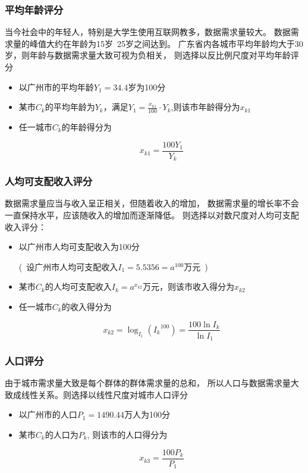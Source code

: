 \documentclass[UTF8,12pt]{ctexart}
\begin{document}
        \subsubsection{平均年龄评分}
            当今社会中的年轻人，特别是大学生使用互联网教多，数据需求量较大。
            数据需求量的峰值大约在年龄为15岁~25岁之间达到。
            广东省内各城市平均年龄均大于30岁，则年龄与数据需求量大致可视为负相关，
            则选择以反比例尺度对平均年龄评分
            \begin{itemize}
                \item 以广州市的平均年龄$Y_1=34.4$岁为100分
                \item 某市$C_k$的平均年龄为$Y_k$，满足$Y_1=\displaystyle\frac{x_{k1}}{100}·Y_k$,则该市年龄得分为$x_{k1}$
                \item 任一城市$C_k$的年龄得分为\begin{large}
                    $$x_{k1}=\frac{100Y_1}{Y_k}$$
                \end{large}
            \end{itemize}

        \subsubsection{人均可支配收入评分}
            数据需求量应当与收入呈正相关，但随着收入的增加，
            数据需求量的增长率不会一直保持水平，应该随收入的增加而逐渐降低。
            则选择以对数尺度对人均可支配收入评分：
            \begin{itemize}
                \item 以广州市人均可支配收入为100分\par 
                    (\ 设广州市人均可支配收入$I_1=5.5356=a^{100}$万元\ )
                \item 某市$C_k$的人均可支配收入$I_k=a^{x_{k2}}$万元，则该市收入得分为$x_{k2}$
                \item 任一城市$C_k$的收入得分为\begin{large}
                    $$x_{k2}=\log _{I_1}({I_k}^{100})=\frac{100\ln I_k}{\ln I_1}$$
                \end{large}
            \end{itemize}

        \subsubsection{人口评分}
            由于城市需求量大致是每个群体的群体需求量的总和，
            所以人口与数据需求量大致成线性关系。则选择以线性尺度对城市人口评分
            \begin{itemize}
                \item 以广州市的人口$P_1=1490.44$万人为100分
                \item 某市$C_k$的人口为$P_k$,
                    则该市的人口得分为\begin{large}
                        $$x_{k3}=\frac{100P_k}{P_1}$$
                    \end{large}
            \end{itemize}
    
\end{document}
